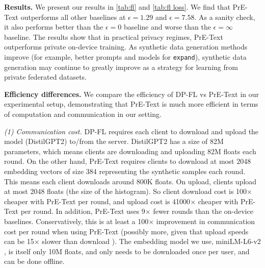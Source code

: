\textbf{Results.}
We present our results in \cref{tab:fl} and \cref{tab:fl loss}.
We find that PrE-Text outperforms all other baselines at $\epsilon = 1.29$ and $\epsilon = 7.58$. As a sanity check, it also performs better than the $\epsilon=0$ baseline and worse than the $\epsilon=\infty$ baseline. The results show that in practical privacy regimes, PrE-Text outperforms private on-device training. As synthetic data generation methods improve (for example, better prompts and models for \texttt{expand}), synthetic data generation may continue to greatly improve as a strategy for learning from private federated datasets.

\textbf{Efficiency differences.}  
We compare the efficiency of DP-FL vs PrE-Text in our experimental setup, demonstrating that PrE-Text is much more efficient in terms of computation and communication in our setting.

\textit{(1) Communication cost.}  DP-FL requires each client to download and upload the model (DistilGPT2) to/from the server. DistilGPT2 has a size of 82M parameters, which means clients are downloading and uploading 82M floats each round. On the other hand, PrE-Text requires clients to download at most 2048 embedding vectors of size 384 representing the synthetic samples each round. This means each client downloads around 800K floats. On upload, clients upload at most 2048 floats (the size of the histogram). So client download cost is 100$\times$ cheaper with PrE-Text per round, and upload cost is 41000$\times$ cheaper with PrE-Text per round. In addition, PrE-Text uses 9$\times$ fewer rounds than the on-device baselines. Conservatively, this is at least a 100$\times$ improvement in communication cost per round when using PrE-Text (possibly more, given that upload speeds can be 15$\times$ slower than download \citep{speedtest.net}). The embedding model we use, miniLM-L6-v2 \citep{reimers-2019-sentence-bert}, is itself only 10M floats, and only needs to be downloaded once per user, and can be done offline.

